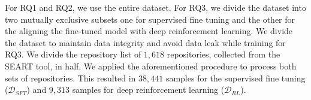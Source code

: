 
\begin{table}[ht]
    \centering
    \caption{Dataset statistics} \label{tab:dataset_stats}
\end{table}
\vspace*{\fill}
For RQ1 and RQ2, we use the entire dataset.
For RQ3,
we divide the dataset into two mutually exclusive subsets one for supervised fine tuning and the other for the aligning the fine-tuned model with deep reinforcement learning.
We divide the dataset to maintain data integrity and avoid data leak while training  for RQ3.
We divide the repository list of $1,618$ repositories, collected from the SEART tool, in half. We applied the aforementioned procedure to process both sets of repositories. This resulted in $38,441$ samples for the supervised fine tuning ($\mathcal{D}_{SFT}$) and $9,313$ samples for deep reinforcement learning ($\mathcal{D}_{RL}$).
